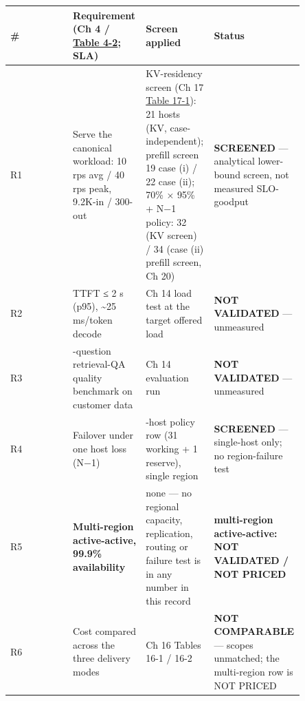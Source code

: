 \nopagebreak[4]
\begin{longtable}[]{@{}
  >{\raggedright\arraybackslash}p{0.2127\linewidth}
  >{\raggedright\arraybackslash}p{0.2127\linewidth}
  >{\raggedright\arraybackslash}p{0.2127\linewidth}
  >{\raggedright\arraybackslash}p{0.2127\linewidth}@{}}
\toprule\noalign{}
\begin{minipage}[b]{\linewidth}\raggedright
\#
\end{minipage} & \begin{minipage}[b]{\linewidth}\raggedright
Requirement (Ch 4 / \hyperref[tab:4.2]{Table 4-2}; SLA)
\end{minipage} & \begin{minipage}[b]{\linewidth}\raggedright
Screen applied
\end{minipage} & \begin{minipage}[b]{\linewidth}\raggedright
Status
\end{minipage} \\
\midrule\noalign{}
\endhead
\bottomrule\noalign{}
\endlastfoot
R1 & Serve the canonical workload: 10 rps avg / 40 rps peak, 9.2K-in /
300-out & KV-residency screen (Ch 17 \hyperref[tab:17.1]{Table 17-1}): 21 hosts (KV,
case-independent); prefill screen 19 case (i) / 22 case (ii); 70\% ×
95\% + N−1 policy: 32 (KV screen) / 34 (case (ii) prefill screen, Ch 20)
& \textbf{SCREENED} --- analytical lower-bound screen, not measured
SLO-goodput \\
\noalign{\label{tab:25.2}}
R2 & TTFT ≤ 2 s (p95), \textasciitilde25 ms/token decode & Ch 14 load
test at the target offered load & \textbf{NOT VALIDATED} ---
unmeasured \\
R3 & 50-question retrieval-QA quality benchmark on customer data & Ch 14
evaluation run & \textbf{NOT VALIDATED} --- unmeasured \\
R4 & Failover under one host loss (N−1) & 32-host policy row (31 working
+ 1 reserve), single region & \textbf{SCREENED} --- single-host only; no
region-failure test \\
R5 & \textbf{Multi-region active-active, 99.9\% availability} & none ---
no regional capacity, replication, routing or failure test is in any
number in this record & \textbf{multi-region active-active: NOT
VALIDATED / NOT PRICED} \\
R6 & Cost compared across the three delivery modes & Ch 16 Tables 16-1 /
16-2 & \textbf{NOT COMPARABLE} --- scopes unmatched; the multi-region
row is NOT PRICED \\
\end{longtable}

